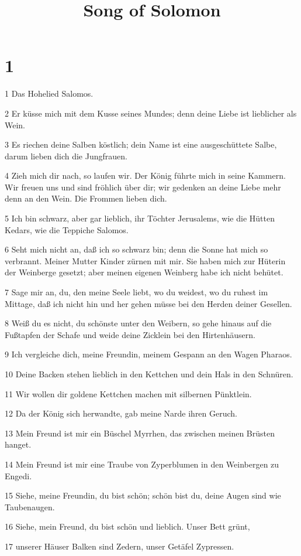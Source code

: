

\title{Song of Solomon}


\chapter{1}

\par 1 Das Hohelied Salomos.
\par 2 Er küsse mich mit dem Kusse seines Mundes; denn deine Liebe ist lieblicher als Wein.
\par 3 Es riechen deine Salben köstlich; dein Name ist eine ausgeschüttete Salbe, darum lieben dich die Jungfrauen.
\par 4 Zieh mich dir nach, so laufen wir. Der König führte mich in seine Kammern. Wir freuen uns und sind fröhlich über dir; wir gedenken an deine Liebe mehr denn an den Wein. Die Frommen lieben dich.
\par 5 Ich bin schwarz, aber gar lieblich, ihr Töchter Jerusalems, wie die Hütten Kedars, wie die Teppiche Salomos.
\par 6 Seht mich nicht an, daß ich so schwarz bin; denn die Sonne hat mich so verbrannt. Meiner Mutter Kinder zürnen mit mir. Sie haben mich zur Hüterin der Weinberge gesetzt; aber meinen eigenen Weinberg habe ich nicht behütet.
\par 7 Sage mir an, du, den meine Seele liebt, wo du weidest, wo du ruhest im Mittage, daß ich nicht hin und her gehen müsse bei den Herden deiner Gesellen.
\par 8 Weiß du es nicht, du schönste unter den Weibern, so gehe hinaus auf die Fußtapfen der Schafe und weide deine Zicklein bei den Hirtenhäusern.
\par 9 Ich vergleiche dich, meine Freundin, meinem Gespann an den Wagen Pharaos.
\par 10 Deine Backen stehen lieblich in den Kettchen und dein Hals in den Schnüren.
\par 11 Wir wollen dir goldene Kettchen machen mit silbernen Pünktlein.
\par 12 Da der König sich herwandte, gab meine Narde ihren Geruch.
\par 13 Mein Freund ist mir ein Büschel Myrrhen, das zwischen meinen Brüsten hanget.
\par 14 Mein Freund ist mir eine Traube von Zyperblumen in den Weinbergen zu Engedi.
\par 15 Siehe, meine Freundin, du bist schön; schön bist du, deine Augen sind wie Taubenaugen.
\par 16 Siehe, mein Freund, du bist schön und lieblich. Unser Bett grünt,
\par 17 unserer Häuser Balken sind Zedern, unser Getäfel Zypressen.


